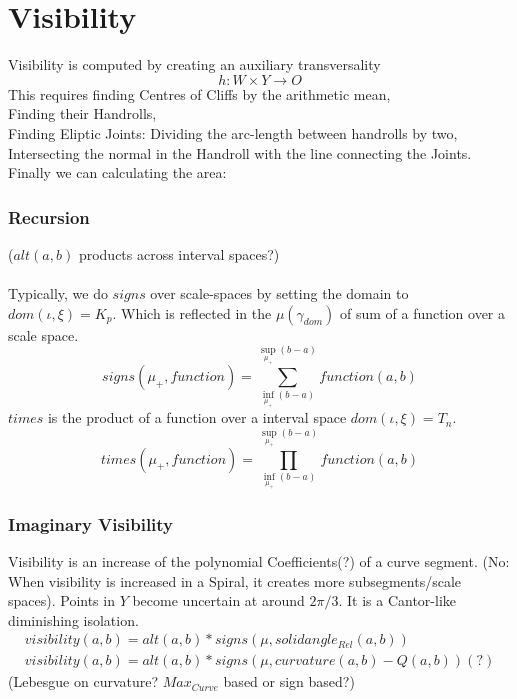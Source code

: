 \documentclass{report}
\begin{document}
\chapter{Visibility}
Visibility is computed by creating an auxiliary transversality
\begin{equation}
h: W \times Y \rightarrow O
\end{equation}
This requires finding Centres of Cliffs by the arithmetic mean,\\
Finding their Handrolls,\\
Finding Eliptic Joints: Dividing the arc-length between handrolls by two,\\
Intersecting the normal in the Handroll with the line connecting the Joints.\\
Finally we can calculating the area:\\

\subsection{Recursion}
($alt(a,b)$ products across interval spaces?)\\\\
Typically, we do $signs$ over scale-spaces by setting the domain to $dom(\iota,\xi)=K_{p}$.
Which is reflected in the $\mu(\gamma_{dom})$ of sum of a function over a scale space.\\
\begin{equation}
signs(\mu_{+},function )= \sum \limits _{\inf \limits _{\mu_{+}} (b-a)}^{\sup \limits _{\mu_{+}} (b-a)} function (a,b)
\end{equation}
$times$ is the product of a function over a interval space $dom(\iota,\xi)=T_{n}$.
\begin{equation}
times(\mu_{+},function) = \prod_{\inf \limits _{\mu_{+}} (b-a)}^{\sup \limits _{\mu_{+}} (b-a)} function(a,b)
\end{equation}

\subsection{Imaginary Visibility}
Visibility is an increase of the polynomial Coefficients(?) of a curve segment.
(No: When visibility is increased in a Spiral, it creates more subsegments/scale spaces). Points in $Y$ become uncertain at around $2\pi/3$. It is a Cantor-like diminishing isolation.
\begin{align}
visibility(a,b)= alt(a,b) * signs(\mu,solidangle_{Rel}(a,b))\\
visibility(a,b)= alt(a,b) * signs(\mu,curvature(a,b)-Q(a,b))(?)
\end{align}
(Lebesgue on curvature? $Max_{Curve}$ based or sign based?)
\end{document}
